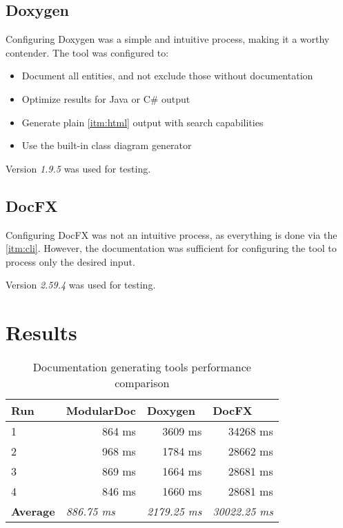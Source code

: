\subsection{Doxygen}

Configuring Doxygen was a simple and intuitive process, making it a worthy contender. The tool was configured to:
\begin{itemize}
    \item Document all entities, and not exclude those without documentation
    \item Optimize results for Java or C\# output
    \item Generate plain \ref{itm:html} output with search capabilities
    \item Use the built-in class diagram generator
\end{itemize}

Version \textit{1.9.5} was used for testing.

\subsection{DocFX}

Configuring DocFX was not an intuitive process, as everything is done via the \ref{itm:cli}. However, the documentation was sufficient for configuring the tool to process only the desired input.

Version \textit{2.59.4} was used for testing.

\section{Results}

\begin{table}[H]
    \centering
    \label{tab:toolPerformance}
    \begin{tabular}{lrrr}
    \hline
    \textbf{Run}            & \multicolumn{1}{l}{\textbf{ModularDoc}}    & \multicolumn{1}{l}{\textbf{Doxygen}}    & \multicolumn{1}{l}{\textbf{DocFX}}       \\ \hline
    \multicolumn{1}{|l|}{1} & \multicolumn{1}{r|}{864 ms}            & \multicolumn{1}{r|}{3609 ms}            & \multicolumn{1}{r|}{34268 ms}            \\ \hline
    \multicolumn{1}{|l|}{2} & \multicolumn{1}{r|}{968 ms}            & \multicolumn{1}{r|}{1784 ms}            & \multicolumn{1}{r|}{28662 ms}            \\ \hline
    \multicolumn{1}{|l|}{3} & \multicolumn{1}{r|}{869 ms}            & \multicolumn{1}{r|}{1664 ms}            & \multicolumn{1}{r|}{28681 ms}            \\ \hline
    \multicolumn{1}{|l|}{4} & \multicolumn{1}{r|}{846 ms}            & \multicolumn{1}{r|}{1660 ms}            & \multicolumn{1}{r|}{28681 ms}            \\ \hline
    \textbf{Average}        & \multicolumn{1}{l}{\textit{886.75 ms}} & \multicolumn{1}{l}{\textit{2179.25 ms}} & \multicolumn{1}{l}{\textit{30022.25 ms}} \\ \hline
    \end{tabular}
    \caption{Documentation generating tools performance comparison}
\end{table}

